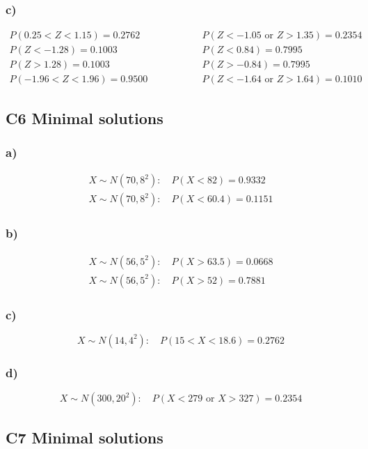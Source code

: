 \subsubsection*{c)}
\[
\begin{array}{lll}
	P(0.25<Z<1.15)=0.2762
	& \qquad \qquad &
	P(Z<-1.05\text{ or }Z>1.35)=0.2354
	\\[0.2cm]
	P(Z<-1.28)=0.1003
	& &
	P(Z<0.84)=0.7995
	\\[0.2cm]
	P(Z>1.28)=0.1003
	& &
	P(Z>-0.84)=0.7995
	\\[0.2cm]
	P(-1.96<Z<1.96)=0.9500
	& &
	P(Z<-1.64\text{ or }Z>1.64)=0.1010
\end{array}
\]

\subsection{C6 Minimal solutions}

\subsubsection*{a)}
\[
\begin{array}{l}
	X\sim N(70,8^2):\quad P(X<82)=0.9332
	\\
	X\sim N(70,8^2):\quad P(X<60.4)=0.1151
\end{array}
\]

\subsubsection*{b)}
\[
\begin{array}{l}
	X\sim N(56,5^2):\quad P(X>63.5)=0.0668
	\\
	X\sim N(56,5^2):\quad P(X>52)=0.7881
\end{array}
\]

\subsubsection*{c)}
\[
X\sim N(14,4^2):\quad P(15<X<18.6)=0.2762
\]

\subsubsection*{d)}
\[
X\sim N(300,20^2):\quad P(X<279\text{ or }X>327)=0.2354
\]

\subsection{C7 Minimal solutions}


